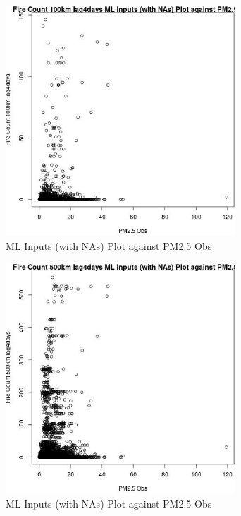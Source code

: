 \begin{figure} 
\centering  
\includegraphics[width=0.77\textwidth]{Code_Outputs/Report_ML_input_PM25_Step4_part_e_de_duplicated_aves_compiled_2019-05-18wNAs_Fire_Count_100km_lag4daysvPM25_Obs.jpg} 
\caption{\label{fig:Report_ML_input_PM25_Step4_part_e_de_duplicated_aves_compiled_2019-05-18wNAsFire_Count_100km_lag4daysvPM25_Obs}ML Inputs (with NAs) Plot against PM2.5 Obs} 
\end{figure} 
 

\clearpage 

\begin{figure} 
\centering  
\includegraphics[width=0.77\textwidth]{Code_Outputs/Report_ML_input_PM25_Step4_part_e_de_duplicated_aves_compiled_2019-05-18wNAs_Fire_Count_500km_lag4daysvPM25_Obs.jpg} 
\caption{\label{fig:Report_ML_input_PM25_Step4_part_e_de_duplicated_aves_compiled_2019-05-18wNAsFire_Count_500km_lag4daysvPM25_Obs}ML Inputs (with NAs) Plot against PM2.5 Obs} 
\end{figure} 
 


